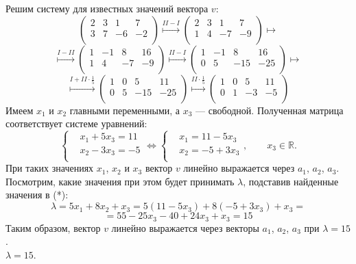 \documentclass[a4paper,12pt]{article}
\begin{document}
Решим систему для известных значений вектора $v$:
$$ 
\left(\begin{array}{ccc|c}
2 & 3 & 1 & 7\\
3 & 7 & -6 & -2\\
\end{array} \right)
\overset{II-I}{\longmapsto}
\left(\begin{array}{ccc|c}
2 & 3 & 1 & 7\\
1 & 4 & -7 & -9\\
\end{array} \right)
\longmapsto
$$
$$
\overset{I-II}{\longmapsto}
\left(\begin{array}{ccc|c}
1 & -1 & 8 & 16\\
1 & 4 & -7 & -9\\
\end{array} \right)
\overset{II-I}{\longmapsto}
\left(\begin{array}{ccc|c}
1 & -1 & 8 & 16\\
0 & 5 & -15 & -25\\
\end{array} \right)
\longmapsto
$$
$$
\overset{I+II \cdot \frac{1}{5}}{\longmapsto}
\left(\begin{array}{ccc|c}
1 & 0 & 5 & 11\\
0 & 5 & -15 & -25\\
\end{array} \right)
\overset{II \cdot \frac{1}{5}}{\longmapsto}
\left(\begin{array}{ccc|c}
1 & 0 & 5 & 11\\
0 & 1 & -3 & -5\\
\end{array} \right)
$$
Имеем $x_1$ и $x_2$ главными переменными, а $x_3$ --- свободной. Полученная матрица соответствует системе уравнений:
$$
\left\{
\begin{aligned}
&x_1 + 5 x_3 = 11\\
&x_2 - 3 x_3 = -5\\
\end{aligned}
\right.
\Leftrightarrow
\left\{
\begin{aligned}
&x_1 = 11-5 x_3\\
&x_2 = -5 +3 x_3\\
\end{aligned}
\right., \qquad x_3 \in \mathbb{R}.
$$
При таких значениях  $x_1$, $x_2$ и $x_3$ вектор $v$ линейно выражается через $a_1$, $a_2$, $a_3$. Посмотрим, какие значения при этом будет принимать $\lambda$, подставив найденные значения в (*):
$$\lambda=5x_1+8x_2+x_3=5(11-5 x_3)+8(-5 +3 x_3)+x_3=$$
$$=55-25x_3-40+24x_3+x_3=15$$
Таким образом, вектор $v$ линейно выражается через векторы $a_1$, $a_2$, $a_3$ при $\lambda=15$.\\
 $\lambda=15$.
\end{document}

